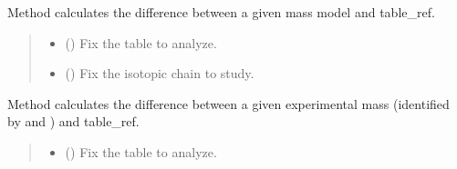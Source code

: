 \documentclass[letterpaper,10pt,english]{sphinxmanual}
\begin{document}
\begin{fulllineitems}
\sphinxAtStartPar
{}

\begin{fulllineitems}
\label{\detokenize{source/api/setup_masses_theory:nucleardatapy.setup_masses_theory.SetupMassesTheory.diff}}
\pysigstartsignatures
{}
\pysigstopsignatures
\sphinxAtStartPar
Method calculates the difference between a given mass
model and table\_ref.
\begin{quote}\begin{description}
\begin{itemize}
\item {} 
\sphinxAtStartPar
{} () \textendash{} Fix the table to analyze.

\item {} 
\sphinxAtStartPar
{} (\sphinxstyleliteralemphasis{\sphinxupquote{, }}) \textendash{} Fix the isotopic chain to study.

\end{itemize}

\end{description}\end{quote}

\sphinxAtStartPar
{}

\end{fulllineitems}


\begin{fulllineitems}
\label{\detokenize{source/api/setup_masses_theory:nucleardatapy.setup_masses_theory.SetupMassesTheory.diff_exp}}
\pysigstartsignatures
{}
\pysigstopsignatures
\sphinxAtStartPar
Method calculates the difference between a given experimental
mass (identified by  and ) and table\_ref.
\begin{quote}\begin{description}
\begin{itemize}
\item {} 
\sphinxAtStartPar
{} () \textendash{} Fix the table to analyze.


\end{itemize}
\end{description}
\end{quote}
\end{fulllineitems}
\end{fulllineitems}
\end{document}
